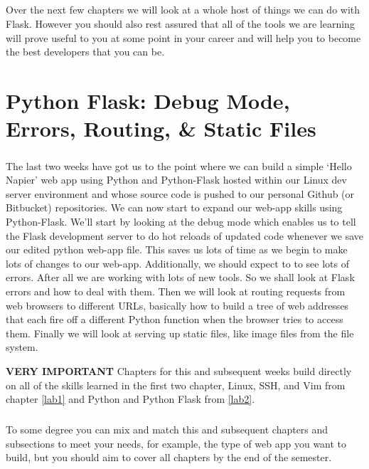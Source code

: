 \documentclass[12pt, a4paper, oneside]{book}
\begin{document}
\paragraph{} Over the next few chapters we will look at a whole host of things we can do with Flask. However you should also rest assured that all of the tools we are learning will prove useful to you at some point in your career and will help you to become the best developers that you can be.



\chapter{Python Flask: Debug Mode, Errors, Routing, \& Static Files}
\label{lab3}
\paragraph{} The last two weeks have got us to the point where we can build a simple `Hello Napier' web app using Python and Python-Flask hosted within our Linux dev server environment and whose source code is pushed to our personal Github (or Bitbucket) repositories. We can now start to expand our web-app skills using Python-Flask. We'll start by looking at the debug mode which enables us to tell the Flask development server to do hot reloads of updated code whenever we save our edited python web-app file. This saves us lots of time as we begin to make lots of changes to our web-app. Additionally, we should expect to to see lots of errors. After all we are working with lots of new tools. So we shall look at Flask errors and how to deal with them. Then we will look at routing requests from web browsers to different URLs, basically how to build a tree of web addresses that each fire off a different Python function when the browser tries to access them. Finally we will look at serving up static files, like image files from the file system.

\begin{framed}
\textbf{VERY IMPORTANT} Chapters for this and subsequent weeks build directly on all of the skills learned in the first two chapter, Linux, SSH, and Vim from chapter \ref{lab1} and Python and Python Flask from \ref{lab2}.

\paragraph{} To some degree you can mix and match this and subsequent chapters and subsections to meet your needs, for example, the type of web app you want to build, but you should aim to cover all chapters by the end of the semester.
\end{framed}
\end{document}
